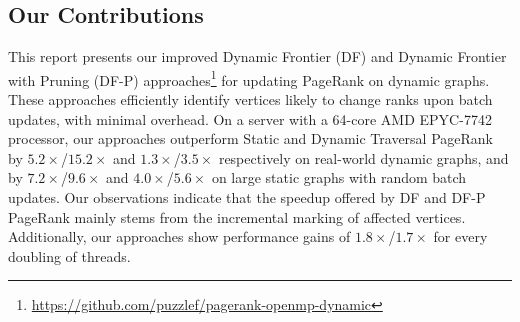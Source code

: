 



\subsection{Our Contributions}

This report presents our improved Dynamic Frontier (DF) and Dynamic Frontier with Pruning (DF-P) approaches\footnote{\url{https://github.com/puzzlef/pagerank-openmp-dynamic}} for updating PageRank on dynamic graphs. These approaches efficiently identify vertices likely to change ranks upon batch updates, with minimal overhead. On a server with a 64-core AMD EPYC-7742 processor, our approaches outperform Static and Dynamic Traversal PageRank by $5.2\times$/$15.2\times$ and $1.3\times$/$3.5\times$ respectively on real-world dynamic graphs, and by $7.2\times$/$9.6\times$ and $4.0\times$/$5.6\times$ on large static graphs with random batch updates. Our observations indicate that the speedup offered by DF and DF-P PageRank mainly stems from the incremental marking of affected vertices. Additionally, our approaches show performance gains of $1.8\times$/$1.7\times$ for every doubling of threads.







